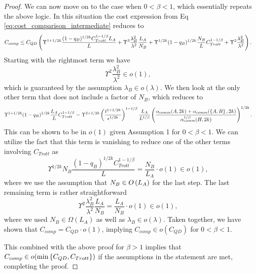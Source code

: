 \begin{proof}
    We can now move on to the case when $0 < \beta < 1$, which essentially repeats the above logic. In this situation the cost expression from Eq \eqref{eq:cost_comparison_intermediate} reduces to 
    \begin{equation}
        C_{comp} \leq C_{QD} \left( \Upsilon^{1 +1/2k} \frac{(1-q_B)^{1/2k} C_{Trott}^{1 - 1/\beta} L_A}{L} + \Upsilon^3 \frac{\lambda_B^2}{\lambda^2} \frac{L_A }{N_B} + \Upsilon^{1/2k}  (1-q_B)^{1/2k} \frac{N_B }{L} C_{Trott}^{1-1/\beta} + \Upsilon^2 \frac{\lambda_B^2}{\lambda^2} \right).
    \end{equation}
    Starting with the rightmost term we have
    \begin{equation}
        \Upsilon^2 \frac{\lambda_B^2}{\lambda^2} \in o(1),
    \end{equation}
    which is guaranteed by the assumption $\lambda_B \in o(\lambda)$. We then look at the only other term that does not include a factor of $N_B$,
    which reduces to
    \begin{equation}
        \Upsilon^{1 +1/2k} (1-q_B)^{1/2k}\frac{L_A}{L} C_{Trott}^{1 - 1/\beta} = \Upsilon^{2 + 1/2k} \left( \frac{t^{1+1/2k}}{\epsilon^{1/2k}} \right)^{1 - 1/\beta} \frac{L_A}{L^{1/\beta}} \left( \frac{\alpha_{comm}(A, 2k) + \alpha_{comm}(\left\{ A,B \right\}, 2k)}{\alpha_{comm}^{1/\beta}(H, 2k)} \right)^{1/2k}.
    \end{equation}
    This can be shown to be in $o(1)$ given Assumption 1 for $ 0 < \beta < 1$. We can utilize the fact that this term is vanishing to reduce one of the other terms involving $C_{Trott}$ as 
    \begin{equation}
        \Upsilon^{1/2k} N_B \frac{(1-q_B)^{1/2k} C_{Trott}^{1-1/\beta}}{L} = \frac{N_B}{L_A} \cdot o(1) \in o(1),
    \end{equation}
    where we use the assumption that $N_B \in O\left( L_A \right)$ for the last step. The last remaining term is rather straightforward
    \begin{equation}
        \Upsilon^2 \frac{\lambda_B^2}{\lambda^2} \frac{L_A}{N_B} = \frac{L_A}{N_B} \cdot o(1) \in o(1),
    \end{equation}
    where we used $N_B \in \Omega(L_A)$ as well as  $\lambda_B \in o( \lambda)$. Taken together, we have shown that $C_{comp} = C_{QD} \cdot o(1)$, implying $C_{comp} \in o(C_{QD})$ for $0 < \beta < 1$.

    This combined with the above proof for $\beta > 1$ implies that $C_{comp} \in o(\min \left\{ C_{QD}, C_{Trott} \right\})$ if the assumptions in the
    statement are met, completing the proof.
\end{proof}

